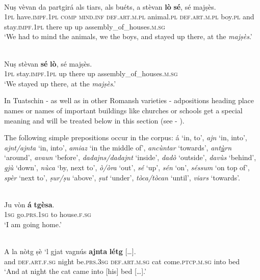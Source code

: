 \ea
\label{}
\\
\gll Nuṣ vèvan da partgirá als tiars, als buéts, a stèvan \textbf{lò} \textbf{sé}, sé majṣès.\\
\textsc{1pl} have.\textsc{impf.1pl} \textsc{comp} \textsc{mind.inf} \textsc{def.art.m.pl} animal.\textsc{pl} \textsc{def.art.m.pl} boy.\textsc{pl} and stay.\textsc{impf.1pl} there up up assembly\_of\_houses.\textsc{m.sg}\\
\glt `We had to mind the animals, we the boys, and stayed up there, at the \textit{majṣès}.'
\z

\ea
\label{}
\\
\gll Nuṣ stèvan \textbf{sé} \textbf{lò}, sé majṣès.\\
\textsc{1pl} stay.\textsc{impf.1pl} up there up assembly\_of\_houses.\textsc{m.sg}\\
\glt `We stayed up there, at the \textit{majṣès}.'
\z

In Tuatschin - as well as in other Romansh varieties - adpositions heading place names or names of important buildings like churches or schools get a special meaning and will be treated below in this section (see  - ).

The following simple prepositions occur in the corpus: á `in, to', \textit{ajn} `in, into', \textit{ajnt/ajnta} `in, into', \textit{amiaz} `in the middle of', \textit{ancùntar} `towards', \textit{ant\underline{ù}rn} `around', \textit{avaun} `before', \textit{dadajns/dadajnt} `inside', \textit{dadò} `outside', \textit{\textit{davùs}} `behind', \textit{gjù} `down', \textit{nùca} `by, next to', \textit{ò/òra} `out', \textit{sé} `up', \textit{sén} `on', \textit{séssum} `on top of', \textit{spèr} `next to', \textit{ṣur/ṣu} `above', \textit{ṣut} `under', \textit{tòca/tòcan} `until', \textit{viars} `towards'.

\ea
\label{}
\\
\gll Ju vòn \textbf{á} \textbf{tgèsa}.\\
\textsc{1sg} go.\textsc{prs.1sg} to house.\textsc{f.sg}\\
\glt `I am going home.'
\z

\ea
\label{}
\\
\gll A la nòtg ṣè `l gjat vagnús \textbf{ajnta} \textbf{létg} […].\\
and \textsc{def.art.f.sg} night be.\textsc{prs.3sg} \textsc{def.art.m.sg} cat come.\textsc{ptcp.m.sg} into bed\\
\glt `And at night the cat came into [his] bed […].'
\z

